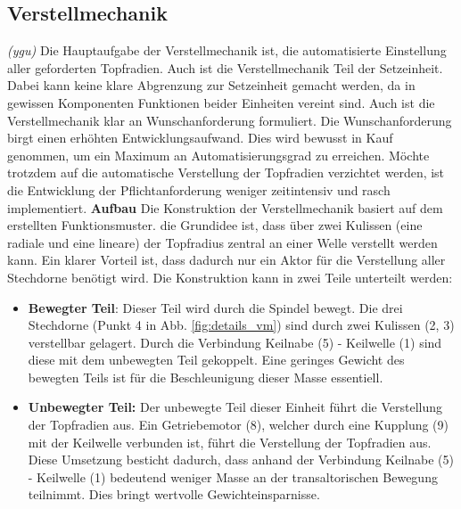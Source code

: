 \subsection{Verstellmechanik}
\label{verstellmechanik}
\textit{(ygu)} Die Hauptaufgabe der Verstellmechanik ist, die automatisierte Einstellung aller geforderten Topfradien. Auch ist die Verstellmechanik Teil der Setzeinheit. Dabei kann keine klare Abgrenzung zur Setzeinheit gemacht werden, da in gewissen Komponenten Funktionen beider Einheiten vereint sind. Auch ist die Verstellmechanik klar an Wunschanforderung formuliert. Die Wunschanforderung birgt einen erhöhten Entwicklungsaufwand. Dies wird bewusst in Kauf genommen, um ein Maximum an Automatisierungsgrad zu erreichen. Möchte trotzdem auf die automatische Verstellung der Topfradien verzichtet werden, ist die Entwicklung der Pflichtanforderung weniger zeitintensiv und rasch implementiert.
\newline
\newline
\textbf{Aufbau}
\newline
Die Konstruktion der Verstellmechanik basiert auf dem erstellten Funktionsmuster. die Grundidee ist, dass über zwei Kulissen (eine radiale und eine lineare) der Topfradius zentral an einer Welle verstellt werden kann. Ein klarer Vorteil ist, dass dadurch nur ein Aktor für die Verstellung aller Stechdorne benötigt wird. Die Konstruktion kann in zwei Teile unterteilt werden:
\begin{itemize}
	\item \textbf{Bewegter Teil}: Dieser Teil wird durch die Spindel bewegt. Die drei Stechdorne (Punkt 4 in Abb. \ref{fig:details_vm}) sind durch zwei Kulissen (2, 3) verstellbar gelagert. Durch die Verbindung Keilnabe (5) - Keilwelle (1) sind diese mit dem unbewegten Teil gekoppelt. Eine geringes Gewicht des bewegten Teils ist für die Beschleunigung dieser Masse essentiell.
	
	\item \textbf{Unbewegter Teil:} Der unbewegte Teil dieser Einheit führt die Verstellung der Topfradien aus. Ein Getriebemotor (8), welcher durch eine Kupplung (9) mit der Keilwelle verbunden ist, führt die Verstellung der Topfradien aus. Diese Umsetzung besticht dadurch, dass anhand der Verbindung Keilnabe (5) - Keilwelle (1) bedeutend weniger Masse an der transaltorischen Bewegung teilnimmt. Dies bringt wertvolle Gewichteinsparnisse.
\end{itemize}
